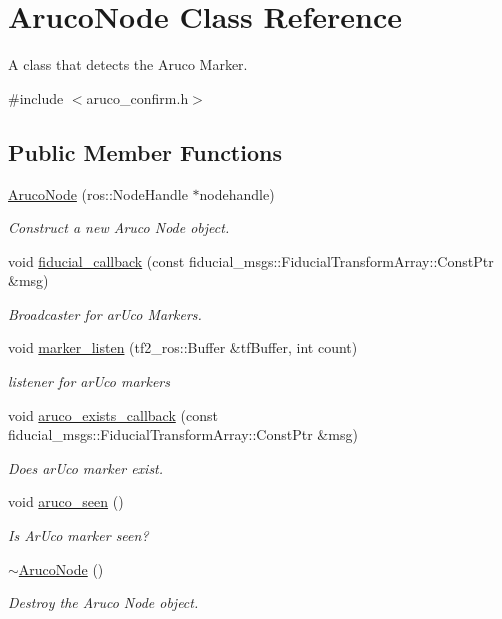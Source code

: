\hypertarget{class_aruco_node}{}\section{Aruco\+Node Class Reference}
\label{class_aruco_node}


A class that detects the Aruco Marker.  




{\ttfamily \#include $<$aruco\+\_\+confirm.\+h$>$}

\subsection*{Public Member Functions}
\begin{DoxyCompactItemize}
\item 
\hyperlink{class_aruco_node_ad539e5027a1d41e9e62f354db9ec40aa}{Aruco\+Node} (ros\+::\+Node\+Handle $\ast$nodehandle)
\begin{DoxyCompactList}\small\item\em Construct a new Aruco Node object. \end{DoxyCompactList}\item 
void \hyperlink{class_aruco_node_af68c583d73a36c483d28b96a6fd22713}{fiducial\+\_\+callback} (const fiducial\+\_\+msgs\+::\+Fiducial\+Transform\+Array\+::\+Const\+Ptr \&msg)
\begin{DoxyCompactList}\small\item\em Broadcaster for ar\+Uco Markers. \end{DoxyCompactList}\item 
void \hyperlink{class_aruco_node_ad79fd951057c9a40f34fc159363fbd94}{marker\+\_\+listen} (tf2\+\_\+ros\+::\+Buffer \&tf\+Buffer, int count)
\begin{DoxyCompactList}\small\item\em listener for ar\+Uco markers \end{DoxyCompactList}\item 
void \hyperlink{class_aruco_node_a38f5977cae0f0cc0d30449db22b2e9d6}{aruco\+\_\+exists\+\_\+callback} (const fiducial\+\_\+msgs\+::\+Fiducial\+Transform\+Array\+::\+Const\+Ptr \&msg)
\begin{DoxyCompactList}\small\item\em Does ar\+Uco marker exist. \end{DoxyCompactList}\item 
void \hyperlink{class_aruco_node_a21fe5af1a16e884424a4065ca6dd608f}{aruco\+\_\+seen} ()
\begin{DoxyCompactList}\small\item\em Is Ar\+Uco marker seen? \end{DoxyCompactList}\item 
\hyperlink{class_aruco_node_a134694163a28530a800198e2c039eb25}{$\sim$\+Aruco\+Node} ()
\begin{DoxyCompactList}\small\item\em Destroy the Aruco Node object. \end{DoxyCompactList}\end{DoxyCompactItemize}
